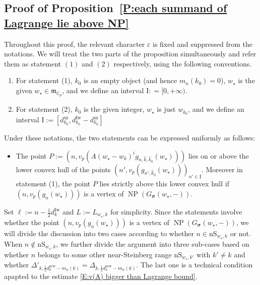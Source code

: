 \documentclass[12pt]{amsart}
\theoremstyle{definition}
\numberwithin{equation}{subsection}
\def\gothm{\mathfrak{m}}
\def\CC{\mathbb{C}}
\def\rmI{\mathrm{I}}
\DeclareMathOperator{\NP}{NP}
\newcommand{\bbsigma}{\boldsymbol{\sigma}}
\newcommand{\new}{\mathrm{new}}
\newcommand{\Iw}{\mathrm{Iw}}
\newcommand{\ur}{\mathrm{ur}}
\newcommand{\nS}{\mathrm{nS}}
\begin{document}
\subsection{Proof of Proposition~\ref{P:each summand of Lagrange lie above NP}}
\label{S:proof of each summand of Lagrange lie above NP}
Throughout this proof, the relevant character $\varepsilon$ is fixed and suppressed from the notations.
We will treat the two parts of the proposition simultaneously and refer them as statement $(1)$ and $(2)$ respectively, using the following conventions.
\begin{enumerate}
\item For statement (1),  $k_0$ is an empty object (and hence $m_n(k_0)=0$), $w_\star$ is the given  $w_\star\in \gothm_{\CC_p}$, and 
we define an interval $\rmI: = [0,+\infty)$.
\item For statement (2), $k_0$ is the given integer, $w_\star$ is just $w_{k_0}$, and we define an interval $\rmI := [d_{k_0}^\ur, d_{k_0}^\Iw-d_{k_0}^\ur]$
\end{enumerate}
Under these notations, the two statements can be expressed uniformly as follows:
\begin{itemize}
\item The point $P:=(n,v_p(A(w_\star-w_k)^ig_{n,\hat{ k},\hat{ k}_0}(w_\star)))$ lies on or above the lower convex hull of the points $(n',v_p(g_{n',\hat{ k}_0}(w_\star)))_{n'\in \rmI}$. Moreover in statement (1), the point $P$ lies strictly above this lower convex hull if $(n,v_p(g_n(w_\star)))$ is a vertex of $\NP(G_{\bbsigma}(w_\star,-))$. 
\end{itemize}


Set $\ell:=n - \tfrac 12 d_k^\Iw$ and $L:=L_{w_\star,k}$ for simplicity. Since the statements involve whether the point $(n,v_p(g_n(w_\star)))$ is a vertex of $\NP(G_{\bbsigma}(w_\star,-))$, we will divide the discussion into two cases according to whether $n\in \nS_{w_\star,k}$ or not. When $n\notin \nS_{w_\star,k}$, we further divide the argument into three sub-cases based on whether $n$ belongs to some other near-Steinberg range $\nS_{w_\star, k'}$ with $k'\neq k$ and whether $\Delta'_{k,\frac 12 d_k^\new-m_n(k)}=\Delta_{k,\frac 12 d_k^\new-m_n(k)}$. The last one is a technical condition apapted to the estimate \eqref{E:v(A) bigger than Lagrange bound}.
\end{document}
